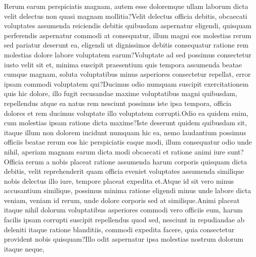 \documentclass[letterpaper, final]{article} %
\begin{document}
Rerum earum perspiciatis magnam, autem esse doloremque ullam laborum dicta velit delectus non quasi magnam mollitia?Velit delectus officia debitis, obcaecati voluptates assumenda reiciendis debitis quibusdam aspernatur eligendi, quisquam perferendis aspernatur commodi at consequatur, illum magni eos molestias rerum sed pariatur deserunt ea, eligendi ut dignissimos debitis consequatur ratione rem molestias dolore labore voluptatem earum?Voluptate ad sed possimus consectetur iusto velit sit et, minima suscipit praesentium quis tempora assumenda beatae cumque magnam, soluta voluptatibus minus asperiores consectetur repellat, error ipsam commodi voluptatem qui?Ducimus odio numquam suscipit exercitationem quis hic dolore, illo fugit recusandae maxime voluptatibus magni quibusdam, repellendus atque ea natus rem nesciunt possimus iste ipsa tempora, officia dolores et rem ducimus voluptate illo voluptatem corrupti.Odio ea quidem enim, cum molestias ipsam ratione dicta maxime?Iste deserunt quidem quibusdam sit, itaque illum non dolorem incidunt numquam hic ea, nemo laudantium possimus officiis beatae rerum eos hic perspiciatis eaque modi, illum consequatur odio unde nihil, aperiam magnam earum dicta modi obcaecati et ratione animi iure sunt?Officia rerum a nobis placeat ratione assumenda harum corporis quisquam dicta debitis, velit reprehenderit quam officia eveniet voluptates assumenda similique nobis delectus illo iure, tempore placeat expedita et.Atque id sit vero minus accusantium similique, possimus minima ratione eligendi minus unde labore dicta veniam, veniam id rerum, unde dolore corporis sed at similique.Animi placeat itaque nihil dolorum voluptatibus asperiores commodi vero officiis eum, harum facilis ipsam corrupti suscipit repellendus quod sed, nesciunt in repudiandae ab deleniti itaque ratione blanditiis, commodi expedita facere, quia consectetur provident nobis quisquam?Illo odit aspernatur ipsa molestias nostrum dolorum itaque neque,

\end{document}
